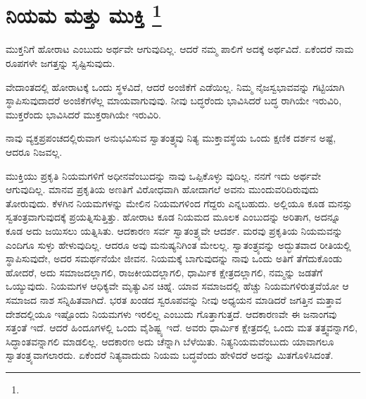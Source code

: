 
\chapter[ನಿಯಮ ಮತ್ತು ಮುಕ್ತಿ ]{ನಿಯಮ ಮತ್ತು ಮುಕ್ತಿ \protect\footnote{}}

ಮುಕ್ತನಿಗೆ ಹೋರಾಟ ಎಂಬುದು ಅರ್ಥವೇ ಆಗುವುದಿಲ್ಲ. ಆದರೆ ನಮ್ಮ ಪಾಲಿಗೆ ಅದಕ್ಕೆ ಅರ್ಥವಿದೆ. ಏಕೆಂದರೆ ನಾಮ ರೂಪಗಳೇ ಜಗತ್ತನ್ನು ಸೃಷ್ಟಿಸುವುದು.

ವೇದಾಂತದಲ್ಲಿ ಹೋರಾಟಕ್ಕೆ ಒಂದು ಸ್ಥಳವಿದೆ, ಆದರೆ ಅಂಜಿಕೆಗೆ ಎಡೆಯಿಲ್ಲ. ನಿಮ್ಮ ನೈಜಸ್ವಭಾವವನ್ನು ಗಟ್ಟಿಯಾಗಿ ಸ್ಥಾಪಿಸುವುದಾದರೆ ಅಂಜಿಕೆಗಳೆಲ್ಲ ಮಾಯವಾಗುವುವು. ನೀವು ಬದ್ಧರೆಂದು ಭಾವಿಸಿದರೆ ಬದ್ಧ ರಾಗಿಯೇ ಇರುವಿರಿ, ಮುಕ್ತರೆಂದು ಭಾವಿಸಿದರೆ ಮುಕ್ತರಾಗಿಯೇ ಇರುವಿರಿ.

ನಾವು ವ್ಯಕ್ತಪ್ರಪಂಚದಲ್ಲಿರುವಾಗ ಅನುಭವಿಸುವ ಸ್ವಾತಂತ್ರ್ಯವು ನಿತ್ಯ ಮುಕ್ತಾವಸ್ಥೆಯ ಒಂದು ಕ್ಷಣಿಕ ದರ್ಶನ ಅಷ್ಟೆ, ಆದರೂ ನಿಜವಲ್ಲ.

ಮುಕ್ತಿಯು ಪ್ರಕೃತಿ ನಿಯಮಗಳಿಗೆ ಅಧೀನವೆಂಬುದನ್ನು ನಾವು ಒಪ್ಪಿಕೊಳ್ಳು ವುದಿಲ್ಲ. ನನಗೆ ಇದು ಅರ್ಥವೇ ಆಗುವುದಿಲ್ಲ. ಮಾನವ ಪ್ರಕೃತಿಯ ಅಣತಿಗೆ ವಿರೋಧವಾಗಿ ಹೋದಾಗಲೆ ಅವನು ಮುಂದುವರಿದಿರುವುದು ತೋರುವುದು. ಕೆಳಗಿನ ನಿಯಮಗಳನ್ನು ಮೇಲಿನ ನಿಯಮಗಳಿಂದ ಗೆದ್ದರು ಎನ್ನಬಹುದು. ಅಲ್ಲಿಯೂ ಕೂಡ ಮನಸ್ಸು ಸ್ವತಂತ್ರವಾಗುವುದಕ್ಕೆ ಪ್ರಯತ್ನಿಸುತ್ತಿತ್ತು. ಹೋರಾಟ ಕೂಡ ನಿಯಮದ ಮೂಲಕ ಎಂಬುದನ್ನು ಅರಿತಾಗ, ಅದನ್ನೂ ಕೂಡ ಅದು ಜಯಿಸಲು ಯತ್ನಿಸಿತು. ಆದಕಾರಣ ಸರ್ವ ಸ್ವಾತಂತ್ರ್ಯವೇ ಆದರ್ಶ. ಮರವು ಪ್ರಕೃತಿಯ ನಿಯಮವನ್ನು ಎಂದಿಗೂ ಸುಳ್ಳು ಹೇಳುವುದಿಲ್ಲ. ಆದರೂ ಅವು ಮನುಷ್ಯನಿಗಿಂತ ಮೇಲಲ್ಲ. ಸ್ವಾತಂತ್ರ್ಯವನ್ನು ಅದ್ಭುತವಾದ ರೀತಿಯಲ್ಲಿ ಸ್ಥಾಪಿಸುವುದೇ, ಅದರ ಸಮರ್ಥನೆಯೇ ಜೀವನ. ನಿಯಮಕ್ಕೆ ಬಾಗುವುದನ್ನು ನಾವು ಒಂದು ಅತಿಗೆ ತೆಗೆದುಕೊಂಡು ಹೋದರೆ, ಅದು ಸಮಾಜದಲ್ಲಾಗಲಿ, ರಾಜಕೀಯದಲ್ಲಾಗಲಿ, ಧಾರ್ಮಿಕ ಕ್ಷೇತ್ರದಲ್ಲಾಗಲಿ, ನಮ್ಮನ್ನು ಜಡತೆಗೆ ಒಯ್ಯುವುದು. ನಿಯಮಗಳ ಆಧಿಕ್ಯವೇ ಮೃತ್ಯುವಿನ ಚಿಹ್ನೆ. ಯಾವ ಸಮಾಜದಲ್ಲಿ ಹೆಚ್ಚು ನಿಯಮಗಳಿರುತ್ತವೆಯೋ ಆ ಸಮಾಜದ ನಾಶ ಸನ್ನಿಹಿತವಾಗಿದೆ. ಭರತ ಖಂಡದ ಸ್ವರೂಪವನ್ನು ನೀವು ಅಧ್ಯಯನ ಮಾಡಿದರೆ ಜಗತ್ತಿನ ಮತ್ತಾವ ದೇಶದಲ್ಲಿಯೂ ಇಷ್ಟೊಂದು ನಿಯಮಗಳು ಇರಲಿಲ್ಲ ಎಂಬುದು ಗೊತ್ತಾಗುತ್ತದೆ. ಆದಕಾರಣವೇ ಈ ಜನಾಂಗವು ಸತ್ತಂತೆ ಇದೆ. ಆದರೆ ಹಿಂದೂಗಳಲ್ಲಿ ಒಂದು ವೈಶಿಷ್ಟ್ಯ ಇದೆ. ಅವರು ಧಾರ್ಮಿಕ ಕ್ಷೇತ್ರದಲ್ಲಿ ಒಂದು ಮತ ತತ್ತ್ವವನ್ನಾಗಲಿ, ಸಿದ್ಧಾಂತವನ್ನಾಗಲಿ ಮಾಡಲಿಲ್ಲ. ಆದಕಾರಣ ಅದು ಚೆನ್ನಾಗಿ ಬೆಳೆಯಿತು. ನಿತ್ಯನಿಯಮವೆಂಬುದು ಯಾವಾಗಲೂ ಸ್ವಾತಂತ್ರ್ಯವಾಗಲಾರದು. ಏಕೆಂದರೆ ನಿತ್ಯವಾದುದು ನಿಯಮ ಬದ್ಧವೆಂದು ಹೇಳಿದರೆ ಅದನ್ನು ಮಿತಗೊಳಿಸಿದಂತೆ.


